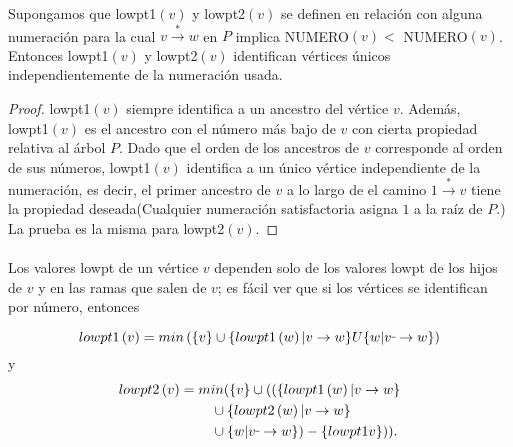 \begin{lemma}
Supongamos que lowpt1$\left(v\right)$ y lowpt2$\left(v\right)$ se definen en relación con alguna numeración para la cual $v \overset{\ast}{\rightarrow} w$ en $P$ implica NUMERO$\left(v\right) < $ NUMERO$\left(v\right)$. Entonces lowpt1$\left(v\right)$ y lowpt2$\left(v\right)$ identifican vértices únicos independientemente de la numeración usada.
\label{lema:3.6}
\end{lemma}

\begin{proof}
lowpt1$\left(v\right)$ siempre identifica a un ancestro del vértice $v$. Además,\\ lowpt1$\left(v\right)$ es el ancestro con el número más bajo de $v$ con cierta propiedad relativa al árbol $P$. Dado que el orden de los ancestros de $v$ corresponde al orden de sus números, lowpt1$\left(v\right)$ identifica a un único vértice independiente de la numeración, es decir, el primer ancestro de $v$ a lo largo de el camino  $1 \overset{\ast}{\rightarrow} v$ tiene la propiedad deseada(Cualquier numeración satisfactoria asigna $1$ a la raíz de $P$.) La prueba es la misma para lowpt2$\left(v\right)$.
\end{proof}

\paragraph{}
Los valores lowpt de un vértice $v$ dependen solo de los valores lowpt de los hijos de $v$ y en las ramas que salen de $v$; es fácil ver que si los vértices se identifican por número, entonces

\begin{equation*}
lowpt1\left(v\right)= min\left(\{v\} \cup \{lowpt1\left(w\right)| v \rightarrow w\} U \{w| v \rule[1mm]{.1cm}{0.4pt} \rightarrow w\}\right)
\end{equation*}
y
\begin{equation*}
\begin{split}
lowpt2\left(v\right) &=  min(\{v\} \cup ((\{lowpt1\left(w\right)| v \rightarrow w\}\\ 
				   & 	\hspace{0.8cm} \cup \{lowpt2\left(w\right)| v \rightarrow w\} \\
				   &	\hspace{0.8cm} \cup \{w | v \rule[1mm]{.1cm}{0.4pt} \rightarrow  w\}) \newline - \{lowpt1v\})).
\end{split}
\end{equation*}

